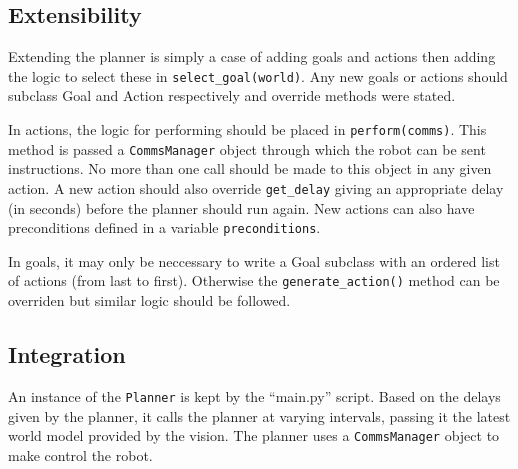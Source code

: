 \FloatBarrier
\subsection{Extensibility}

Extending the planner is simply a case of adding goals and actions then adding the logic to select these in \texttt{select\_goal(world)}. Any new goals or actions should subclass Goal and Action respectively and override methods were stated.

In actions, the logic for performing should be placed in \texttt{perform(comms)}. This method is passed a \texttt{CommsManager} object through which the robot can be sent instructions. No more than one call should be made to this object in any given action. A new action should also override \texttt{get\_delay} giving an appropriate delay (in seconds) before the planner should run again. New actions can also have preconditions defined in a variable \texttt{preconditions}.

In goals, it may only be neccessary to write a Goal subclass with an ordered list of actions (from last to first). Otherwise the \texttt{generate\_action()} method can be overriden but similar logic should be followed.

\subsection{Integration}

An instance of the \texttt{Planner} is kept by the ``main.py'' script. Based on the delays given by the planner, it calls the planner at varying intervals, passing it the latest world model provided by the vision. The planner uses a \texttt{CommsManager} object to make control the robot.

